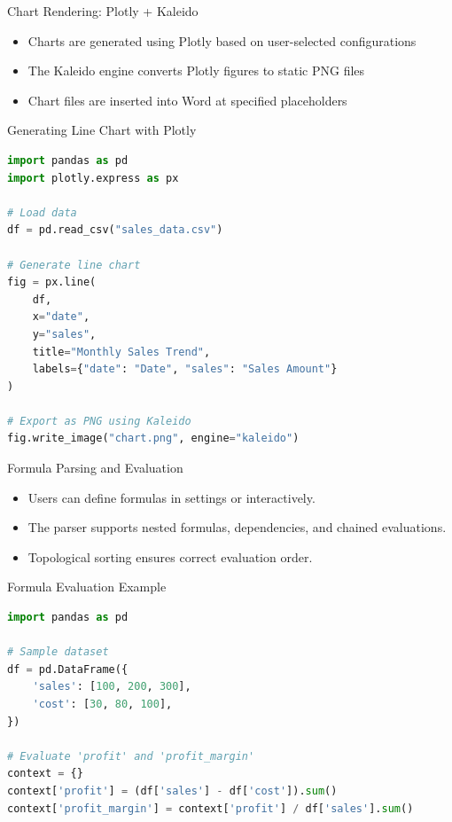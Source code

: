 \documentclass[handout, 12pt]{beamer}
\begin{document}
	\begin{frame}{Chart Rendering: Plotly + Kaleido}
		\begin{itemize}
		  \item Charts are generated using Plotly based on user-selected configurations
		  \item The Kaleido engine converts Plotly figures to static PNG files
		  \item Chart files are inserted into Word at specified placeholders
		\end{itemize}
	\end{frame}

	\begin{frame}[fragile]{Generating Line Chart with Plotly}
		\begin{lstlisting}[language=Python, breaklines=true, basicstyle=\fontsize{6.5pt}{7.8pt}\selectfont]
import pandas as pd
import plotly.express as px

# Load data
df = pd.read_csv("sales_data.csv")

# Generate line chart
fig = px.line(
    df,
    x="date",
    y="sales",
    title="Monthly Sales Trend",
    labels={"date": "Date", "sales": "Sales Amount"}
)

# Export as PNG using Kaleido
fig.write_image("chart.png", engine="kaleido")
\end{lstlisting}
		\end{frame}
		

	\begin{frame}{Formula Parsing and Evaluation}
		\begin{itemize}
		  \item Users can define formulas in settings or interactively.
		  \item The parser supports nested formulas, dependencies, and chained evaluations.
		  \item Topological sorting ensures correct evaluation order.
		\end{itemize}
	\end{frame}

	\begin{frame}[fragile]{Formula Evaluation Example}
		\begin{lstlisting}[language=Python, breaklines=true, basicstyle=\fontsize{6.5pt}{7.8pt}\selectfont]
import pandas as pd

# Sample dataset
df = pd.DataFrame({
    'sales': [100, 200, 300],
    'cost': [30, 80, 100],
})

# Evaluate 'profit' and 'profit_margin'
context = {}
context['profit'] = (df['sales'] - df['cost']).sum()
context['profit_margin'] = context['profit'] / df['sales'].sum()
\end{lstlisting}
	\end{frame}
\end{document}
